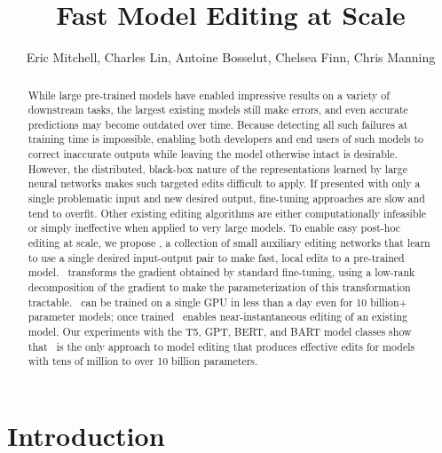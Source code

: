 \documentclass{article}
\title{Fast Model Editing at Scale}
\author{Eric Mitchell, Charles Lin, Antoine Bosselut, Chelsea Finn, Chris Manning}
\begin{document}
\maketitle

\begin{abstract}
    While large pre-trained models have enabled impressive results on a variety of downstream tasks, the largest existing models still make errors, and even accurate predictions may become outdated over time. Because detecting all such failures at training time is impossible, enabling both developers and end users of such models to correct inaccurate outputs while leaving the model otherwise intact is desirable. However, the distributed, black-box nature of the representations learned by large neural networks makes such targeted edits difficult to apply. If presented with only a single problematic input and new desired output, fine-tuning approaches are slow and tend to overfit. Other existing editing algorithms are either computationally infeasible or simply ineffective when applied to very large models. To enable easy post-hoc editing at scale, we propose \name, a collection of small auxiliary editing networks that learn to use a single desired input-output pair to make fast, local edits to a pre-trained model. \name~transforms the gradient obtained by standard fine-tuning, using a low-rank decomposition of the gradient to make the parameterization of this transformation tractable. \name~can be trained on a single GPU in less than a day even for 10 billion+ parameter models; once trained \name~enables near-instantaneous editing of an existing model. Our experiments with the T5, GPT, BERT, and BART model classes show that \name~is the only approach to model editing that produces effective edits for models with tens of million to over 10 billion parameters.
\end{abstract}

\section{Introduction}
\label{sec:intro}


\end{document}
